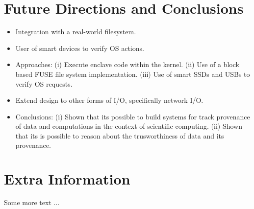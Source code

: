 \documentclass[withindex,glossary]{cam-thesis}
\begin{document}
\chapter{Future Directions and Conclusions}
\begin{itemize}
\item Integration with a real-world filesystem.
\item User of smart devices to verify OS actions.
\item Approaches:
(i) Execute enclave code within the kernel.
(ii) Use of a block based FUSE file system implementation.
(iii) Use of smart SSDs and USBs to verify OS requests.
\item Extend design to other forms of I/O, specifically network I/O.

\item Conclusions: 
(i) Shown that its possible to build systems for track provenance of data and computations in the context of scientific computing.
(ii) Shown that its is possible to reason about the trusworthiness of data and its provenance.
\end{itemize}




\cleardoublepage
{}
{}






\appendix

\chapter{Extra Information}
Some more text ...



\printthesisindex
\end{document}
